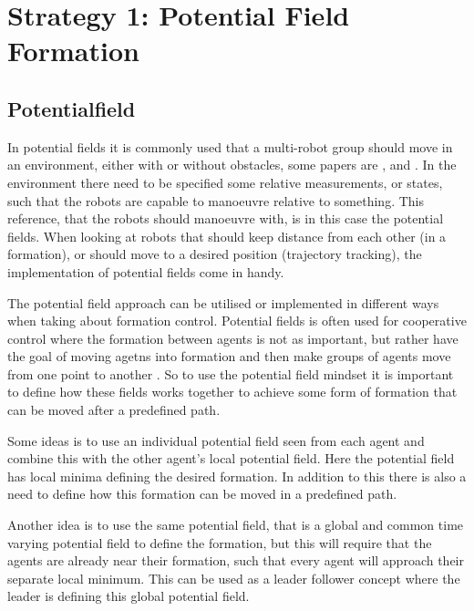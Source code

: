 \section{Strategy 1: Potential Field Formation}
\label{sc:potential-fields}


\subsection{Potentialfield}
In potential fields it is commonly used that a multi-robot group should move in an environment, either with or without obstacles, some papers are \citep{pfmrm}, \citep{fccsc} and \citep{UAVff3dpf}. In the environment there need to be specified some relative measurements, or states, such that the robots are capable to manoeuvre relative to something. This reference, that the robots should manoeuvre with, is in this case the potential fields. When looking at robots that should keep distance from each other (in a formation), or should move to a desired position (trajectory tracking), the implementation of potential fields come in handy.

The potential field approach can be utilised or implemented in
different ways when taking about formation control. Potential fields
is often used for cooperative control where the formation between
agents is not as important, but rather have the goal of moving agetns into formation and then make groups of
agents move from one point to another \citep{5504176}. So to
use the potential field mindset it is important to define how these
fields works together to achieve some form of formation that can be
moved after a predefined path. 

Some ideas is to use an individual potential field seen from each
agent and combine this with the other agent's local potential field.
Here the potential field has local minima defining the desired
formation. In addition to this there is also a need to define how this
formation can be moved in a predefined path.

Another idea is to use the same potential field, that is a global and
common time varying potential field to define the formation, but this
will require that the agents are already near their formation, such
that every agent will approach their separate local minimum. This can
be used as a leader follower concept where the leader is defining this
global potential field.

